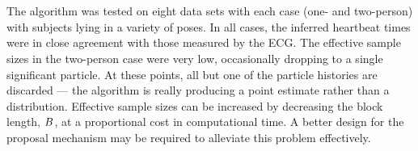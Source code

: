 \documentclass{article}
\begin{document}
\begin{figure}
\centering
{} \\
 \\
\caption{}
\label{fig:two_person}
\end{figure}

The algorithm was tested on eight data sets with each case (one- and two-person) with subjects lying in a variety of poses. In all cases, the inferred heartbeat times were in close agreement with those measured by the ECG. The effective sample sizes in the two-person case were very low, occasionally dropping to a single significant particle. At these points, all but one of the particle histories are discarded --- the algorithm is really producing a point estimate rather than a distribution. Effective sample sizes can be increased by decreasing the block length, $B$, at a proportional cost in computational time. A better design for the proposal mechanism may be required to alleviate this problem effectively.
\end{document}
